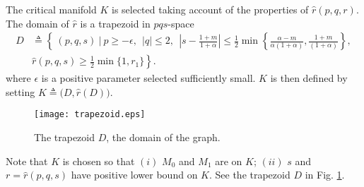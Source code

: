 \documentclass[usletter,11pt]{article}
\theoremstyle{remark}
\begin{document}
The critical manifold $K$ is selected taking account of the properties of $\hat{r}(p,q,r)$. The domain of $\hat{r}$ is a trapezoid in $pqs$-space 
\begin{align*}
 D &\triangleq \left\{ \: (p,q,s) \: \Big| \:  p\ge-\epsilon, ~~ |q|\le2, ~~ \left|s-\frac{1+m}{1+\alpha}\right| \le \frac{1}{2}\min\left\{\frac{\alpha-m}{\alpha(1+\alpha)},\frac{1+m}{(1+\alpha)}\right\},\right.  \\
 &\left. \hat{r}(p,q,s)\ge \frac{1}{2}\min\{1,r_1\}\right\}.
\end{align*}
where  $\epsilon$ is a positive parameter selected sufficiently small.  $K$ is then defined by setting $K\triangleq\big(D,\hat{r}(D)\big)$.
\begin{figure}[ht]
 \centering
  \texttt{[image: trapezoid.eps]}
  \caption{The trapezoid $D$, the domain of the graph.} \label{fig:D}
\end{figure}
Note that $K$ is chosen so that $(i)$ $M_0$ and $M_1$ are on $K$; $(ii)$ $s$ and $r=\hat{r}(p,q,s)$ have positive lower bound on $K$. See the trapezoid $D$ in Fig. \ref{fig:D}. 
\end{document}
